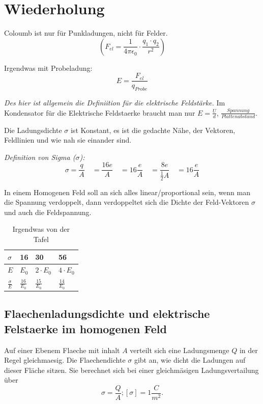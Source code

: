 \documentclass{report}
\begin{document}
\section{Wiederholung}

Coloumb ist nur f\"ur Punkladungen, nicht f\"ur Felder.
\[\left(F_{el}=\frac{1}{4\pi\epsilon_0}\cdot \frac{q_1\cdot q_2}{r^2}\right)\]

Irgendwas mit Probeladung: \[E=\frac{F_{el}}{q_{Probe}}\]

\textit{Des hier ist allgemein die Definiition f\"ur die elektrische Feldst\"arke.}
Im Kondensator f\"ur die Elektrische Feldstaerke braucht man nur
$E=\frac{U}{d}$, $\frac{Spannung}{Plattenabstand}$.


Die Ladungsdichte $\sigma$ ist Konstant, es ist die gedachte N\"ahe, der
Vektoren, Feldlinien und wie nah sie einander sind.

\textit{Definition von Sigma ($\sigma$):}
\[\sigma=\frac{q}{A} \quad =\frac{16e}{A} \quad = 16 \frac{e}{A} \quad = \frac{8e}{\frac{1}{2}A} \quad = 16 \frac{e}{A}\]

In einem Homogenen Feld soll an sich alles linear/proportional sein, wenn man
die Spannung verdoppelt, dann verdoppeltet sich die Dichte der Feld-Vektoren
$\sigma$ und auch die Feldspannung.

\begin{table}
  \caption{Irgendwas von der Tafel}
  \begin{center}
    \begin{tabular}[c]{l|l|l|l}
      \hline
      $\sigma$ & 16 & 30 & 56 \\
      \hline
      $E$ & $E_0$ & $2\cdot E_0$ & $4\cdot E_0$\\
      \hline
      $\frac{\sigma}{E}$ & $\frac{16}{E_0}$ & $\frac{15}{E_0}$ & $\frac{14}{E_0}$\\
    \end{tabular}
  \end{center}
\end{table}

\subsection{Flaechenladungsdichte und elektrische Felstaerke im homogenen Feld}

\begin{tcolorbox}[colback=red!10!white,colframe=red!75!black]
Auf einer Ebenem Flaeche mit inhalt $A$ verteilt sich eine Ladungsmenge $Q$ in
der Regel gleichmaesig. Die Flaechendichte $\sigma$ gibt an, wie dicht die
Ladungen auf dieser Fl\"ache sitzen. Sie berechnet sich bei einer
gleichm\"asigen Ladungsvertailung \"uber \[\sigma = \frac{Q}{A}; [\sigma]=1
\frac{C}{m^2}.\]
\end{tcolorbox}
\end{document}
